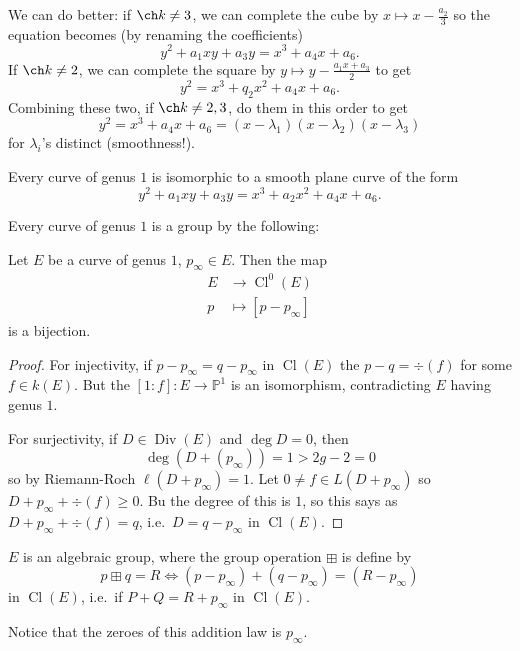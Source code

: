 \documentclass[a4paper]{article}
\DeclareMathOperator{\Cl}{Cl}
\renewcommand*{\P}{\mathbb{P}}
\DeclareMathOperator{\Div}{Div} %
\begin{document}
We can do better: if \(\ch k \neq 3\), we can complete the cube by \(x \mapsto x - \frac{a_2}{3}\) so the equation becomes (by renaming the coefficients)
\[
  y^2 + a_1xy + a_3y = x^3 + a_4x + a_6.
\]
If \(\ch k \neq 2\), we can complete the square by \(y \mapsto y - \frac{a_1x + a_3}{2}\) to get
\[
  y^2 = x^3 + q_2x^2 + a_4x + a_6.
\]
Combining these two, if \(\ch k \neq 2, 3\), do them in this order to get
\[
  y^2 = x^3 + a_4x + a_6 = (x - \lambda_1)(x - \lambda_2)(x - \lambda_3)
\]
for \(\lambda_i\)'s distinct (smoothness!).

\begin{theorem}
  Every curve of genus \(1\) is isomorphic to a smooth plane curve of the form
  \[
    y^2 + a_1xy + a_3y = x^3 + a_2x^2 + a_4x + a_6.
  \]
\end{theorem}

Every curve of genus \(1\) is a group by the following:
\begin{proposition}
  Let \(E\) be a curve of genus \(1\), \(p_\infty \in E\). Then the map
  \begin{align*}
    E &\to \Cl^0(E) \\
    p &\mapsto [p - p_\infty]
  \end{align*}
  is a bijection.
\end{proposition}

\begin{proof}
  For injectivity, if \(p - p_\infty = q - p_\infty\) in \(\Cl(E)\) the \(p - q = \div (f)\) for some \(f \in k(E)\). But the \([1:f]: E \to \P^1\) is an isomorphism, contradicting \(E\) having genus \(1\).

  For surjectivity, if \(D \in \Div(E)\) and \(\deg D = 0\), then
  \[
    \deg(D + (p_\infty)) = 1 > 2g - 2 = 0
  \]
  so by Riemann-Roch \(\ell(D + p_\infty) = 1\). Let \(0 \neq f \in L(D + p_\infty)\) so \(D + p_\infty + \div (f) \geq 0\). Bu the degree of this is \(1\), so this says as \(D + p_\infty + \div(f) = q\), i.e.\ \(D = q - p_\infty\) in \(\Cl(E)\).
\end{proof}

\begin{corollary}
  \(E\) is an algebraic group, where the group operation \(\boxplus\) is define by
  \[
    p \boxplus q = R \iff (p - p_\infty) + (q - p_\infty) = (R - p_\infty)
  \]
  in \(\Cl(E)\), i.e.\ if \(P + Q = R + p_\infty\) in \(\Cl(E)\).
\end{corollary}
Notice that the zeroes of this addition law is \(p_\infty\).
\end{document}
